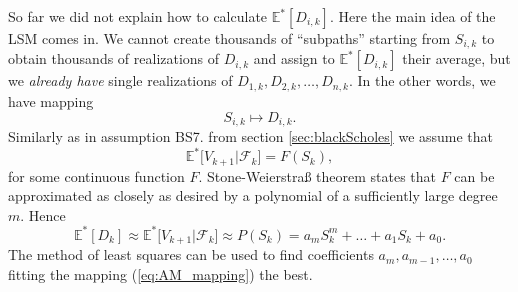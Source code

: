 \documentclass[a4paper,11pt, twoside]{book}
\theoremstyle{definition}
\theoremstyle{remark}
\def\Em{{\mathbb{E}^*}}
\begin{document}
So far we did not explain how to calculate $\Em[D_{i,k}]$. Here the main idea of the LSM comes in. We cannot create thousands of ``subpaths'' starting from $S_{i,k}$ to obtain thousands of realizations of $D_{i,k}$ and assign to $\Em[D_{i,k}]$ their average, but we \emph{already have} single realizations of $D_{1,k}, D_{2,k},\ldots, D_{n,k}$. In the other words, we have mapping
\begin{equation}
 \label{eq:AM_mapping}
  S_{i,k} \mapsto D_{i,k}.
\end{equation}
Similarly as in assumption BS7. from section \ref{sec:blackScholes} we assume that
\begin{equation*}
 \Em\bigl[ V_{k+1} | \mathcal{F}_{k} \bigr] = F(S_{k}),
\end{equation*}
for some continuous function $F$. Stone-Weierstra\ss{} theorem states that $F$ can be approximated as closely as desired by a polynomial of a sufficiently large degree $m$. Hence
\begin{equation*}
 \Em[D_{k}] \approx \Em\bigl[ V_{k+1} | \mathcal{F}_{k} \bigr] \approx P(S_{k}) = a_m S_{k}^m + \ldots + a_1 S_{k} + a_0.
\end{equation*}
The method of least squares can be used to find coefficients $a_m, a_{m-1},\ldots,a_0$ fitting the mapping (\ref{eq:AM_mapping}) the best.
\end{document}
